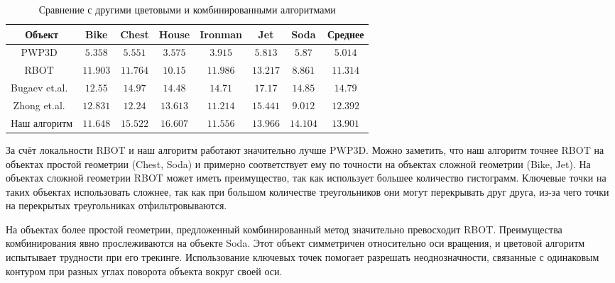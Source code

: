 \begin{table}[h]
\caption{\label{tab:analogues}Сравнение с другими цветовыми и комбинированными алгоритмами}
\begin{center}
\begin{tabular}{|c|c|c|c|c|c|c|c|}
\hline
Объект & Bike & Chest & House & Ironman & Jet & Soda & Среднее \\
\hline
PWP3D~\cite{PWP3D} & $5.358$ & $5.551$ & $3.575$ &
$3.915$ & $5.813$ & $5.87$ & $5.014$ \\
\hline
RBOT~\cite{Tjaden2018} & $11.903$ & $11.764$ & $10.15$ &
$11.986$ & $13.217$ & $8.861$ & $11.314$ \\
\hline
Bugaev et.al.~\cite{Bugaev_2018_ECCV} & $12.55$ & $14.97$ & $14.48$ &
$14.71$ & $17.17$ & $14.85$ & $14.79$ \\
\hline
Zhong et.al.~\cite{Zhong2020} & $12.831$ & $12.24$ & $13.613$ &
$11.214$ & $15.441$ & $9.012$ & $12.392$ \\
\hline
Наш алгоритм & $11.648$ & $15.522$ & $16.607$ & $11.556$ & $13.966$ & $14.104$ & $13.901$ \\
\hline
\end{tabular}
\end{center}
\end{table}

За счёт локальности RBOT и наш алгоритм работают значительно лучше PWP3D. 
Можно заметить, что наш алгоритм точнее RBOT на объектах простой геометрии (Chest, Soda) и примерно соответствует ему по точности на объектах сложной геометрии (Bike, Jet).
На объектах сложной геометрии RBOT может иметь преимущество, так как использует большее количество гистограмм.
Ключевые точки на таких объектах использовать сложнее, так как при большом количестве треугольников они могут перекрывать друг друга, из-за чего точки на перекрытых треугольниках отфильтровываются.

На объектах 	более простой геометрии, предложенный комбинированный метод значительно превосходит RBOT.
Преимущества комбинирования явно прослеживаются на объекте Soda. 
Этот объект симметричен относительно оси вращения, и цветовой алгоритм испытывает трудности при его трекинге.
Использование ключевых точек помогает разрешать неоднозначности, связанные с одинаковым контуром при разных углах поворота объекта вокруг своей оси.


